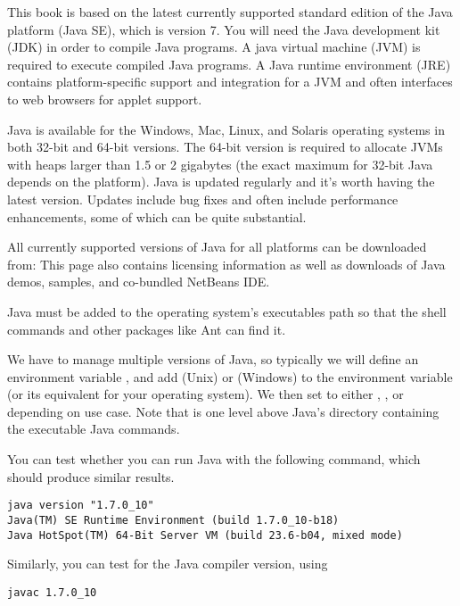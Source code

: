This book is based on the latest currently supported standard edition
of the Java platform (Java SE), which is version 7.  You will need the
Java development kit (JDK) in order to compile Java programs.  A java
virtual machine (JVM) is required to execute compiled Java programs.
A Java runtime environment (JRE) contains platform-specific support
and integration for a JVM and often interfaces to web browsers for
applet support.

Java is available for the Windows, Mac, Linux, and Solaris operating
systems in both 32-bit and 64-bit versions.
The 64-bit version
is required to allocate JVMs with heaps larger than 1.5 or 2 gigabytes
(the exact maximum for 32-bit Java depends on the platform).  
Java is updated regularly and it's worth having the latest version.
Updates include bug fixes and often include performance enhancements,
some of which can be quite substantial.

All currently supported versions of Java for all platforms can be downloaded from:
%
%
This page also contains licensing information as well as downloads of
Java demos, samples, and co-bundled NetBeans IDE.

Java must be added to the operating system's executables path so
that the shell commands and other packages like Ant can find it.

We have to manage multiple versions of Java, so typically we will
define an environment variable , and add
 (Unix) or
 (Windows) to the
 environment variable (or its equivalent for your
operating system).  We then set  to either
, , or 
depending on use case.  Note that  is one level
above Java's  directory containing the executable Java
commands.

You can test whether you can run Java with the following command, which
should produce similar results.
%
\begin{verbatim}
java version "1.7.0_10"
Java(TM) SE Runtime Environment (build 1.7.0_10-b18)
Java HotSpot(TM) 64-Bit Server VM (build 23.6-b04, mixed mode)
\end{verbatim}
%
Similarly, you can test for the Java compiler version, using
%
\begin{verbatim}
javac 1.7.0_10
\end{verbatim}


